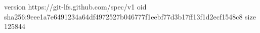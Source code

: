 version https://git-lfs.github.com/spec/v1
oid sha256:9eee1a7e6491234a64df4972527b046777f1eebf77d3b17ff13f1d2ecf1548c8
size 125844
